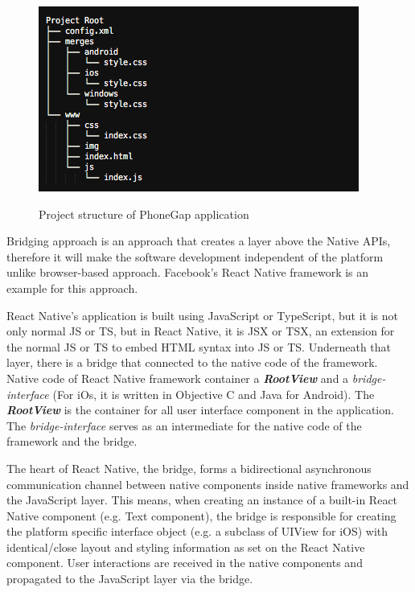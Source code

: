 {    \begin{figure}[!ht]
        \centering
        \includegraphics[scale=0.7]{Picture/mobile/phonegap_project_structure.png}
        \label{fig:structure_phonegap_app}
        \caption{Project structure of PhoneGap application}
    \end{figure}
}

\par{
	Bridging approach is an approach that creates a layer above the Native APIs, therefore it will make the software development independent of the platform unlike browser-based approach.
	Facebook's React Native framework is an example for this approach.

	React Native's application is built using JavaScript or TypeScript, but it is not only normal JS or TS, but in React Native, it is JSX or TSX, an extension for the normal JS or TS to embed HTML syntax into JS or TS.
	Underneath that layer, there is a bridge that connected to the native code of the framework.
	Native code of React Native framework container a \textbf{\textit{RootView}} and a \textit{bridge-interface} (For iOs, it is written in Objective C and Java for Android). The \textbf{\textit{RootView}} is the container for all user interface component in the application. The \textit{bridge-interface} serves as an intermediate for the native code of the framework and the bridge.
	
	The heart of React Native, the bridge, forms a bidirectional asynchronous communication
channel between native components inside native frameworks and the JavaScript layer.
This means, when creating an instance of a built-in React Native component (e.g. Text
component), the bridge is responsible for creating the platform specific interface object
(e.g. a subclass of UIView for iOS) with identical/close layout and styling information as
set on the React Native component. User interactions are received in the native
components and propagated to the JavaScript layer via the bridge.
}
